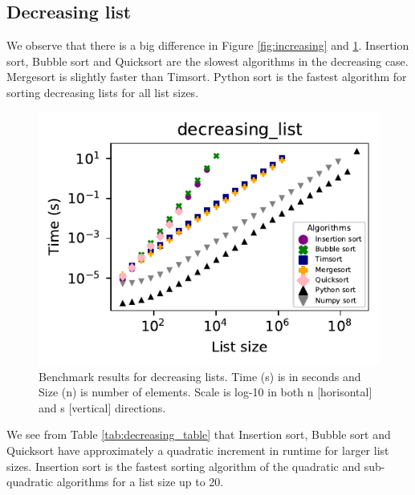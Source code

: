 \documentclass[sigconf, nonacm, natbib, screen, balance=False]{acmart}
\begin{document}
\subsection{Decreasing list}

We observe that there is a big difference in Figure \ref{fig:increasing} and \ref{fig:decreasing_list}. Insertion sort, Bubble sort and Quicksort are the slowest algorithms in the decreasing case. Mergesort is slightly faster than Timsort. Python sort is the fastest algorithm for sorting decreasing lists for all list sizes. 
\begin{figure}[h!]
  \includegraphics[width=\linewidth]{../figures/decreasing_list.pdf}
  \caption{Benchmark results for decreasing lists. Time (s) is in seconds and Size (n) is number of elements. Scale is log-10 in both n [horisontal] and s [vertical] directions.}
  \label{fig:decreasing_list}
\end{figure}
\FloatBarrier

We see from Table \ref{tab:decreasing_table} that Insertion sort, Bubble sort and Quicksort have approximately a quadratic increment in runtime for larger list sizes. Insertion sort is the fastest sorting algorithm of the quadratic and sub-quadratic algorithms for a list size up to 20. 
\end{document}
